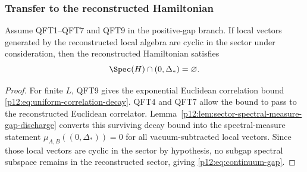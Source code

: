 \documentclass[12pt,a4paper]{article}
\begin{document}
\subsubsection{Transfer to the reconstructed Hamiltonian}
\label{p12:sec:gap-transfer-reconstructed-hamiltonian}

\begin{theorem}
\label{p12:thm:mass-gap-transfer}
Assume QFT1--QFT7 and QFT9 in the positive-gap branch.  If local vectors generated by the reconstructed local algebra are cyclic in the sector under consideration, then the reconstructed Hamiltonian satisfies
\begin{equation}
\label{p12:eq:continuum-gap}
\Spec(H)\cap(0,\Delta_\ast)=\varnothing .
\end{equation}
\end{theorem}
\begin{proof}
For finite \(L\), QFT9 gives the exponential Euclidean correlation bound \eqref{p12:eq:uniform-correlation-decay}.  QFT4 and QFT7 allow the bound to pass to the reconstructed Euclidean correlator.  Lemma~\ref{p12:lem:sector-spectral-measure-gap-discharge} converts this surviving decay bound into the spectral-measure statement \(\mu_{A,B}((0,\Delta_\ast))=0\) for all vacuum-subtracted local vectors.  Since those local vectors are cyclic in the sector by hypothesis, no subgap spectral subspace remains in the reconstructed sector, giving \eqref{p12:eq:continuum-gap}.
\end{proof}
\end{document}
